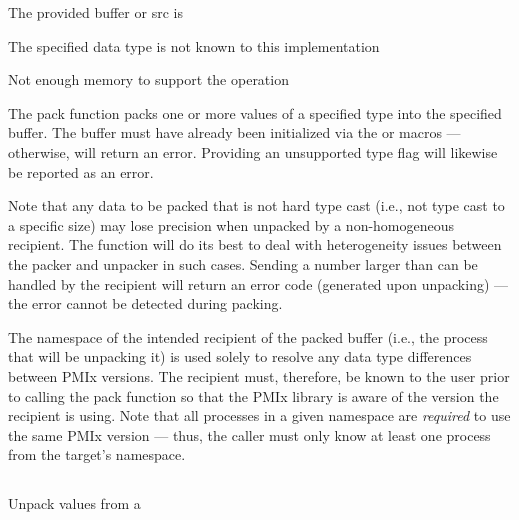 \returnstart
\begin{constantdesc}
\item {} The provided buffer or src is 
\item {} The specified data type is not known to this implementation
\item {} Not enough memory to support the operation
\end{constantdesc}
\returnend

\descr

The pack function packs one or more values of a specified type into the specified buffer.  The buffer must have already been
initialized via the  or 
macros --- otherwise,  will return an error.
Providing an unsupported type flag will likewise be reported as an error.

Note that any data to be packed that is not hard type cast (i.e.,
not type cast to a specific size) may lose precision when unpacked
by a non-homogeneous recipient.  The  function will do its best to deal
with heterogeneity issues between the packer and unpacker in such
cases. Sending a number larger than can be handled by the recipient
will return an error code (generated upon unpacking) ---
the error cannot be detected during packing.

The namespace of the intended recipient of the packed buffer (i.e., the
process that will be unpacking it) is used solely to resolve any data type
differences between \ac{PMIx} versions. The recipient must, therefore, be
known to the user prior to calling the pack function so that the
\ac{PMIx} library is aware of the version the recipient is using. Note that
all processes in a given namespace are \textit{required} to use the same \ac{PMIx}
version --- thus, the caller must only know at least one process from the
target's namespace.


\subsection{}

\summary

Unpack values from a 

\format

